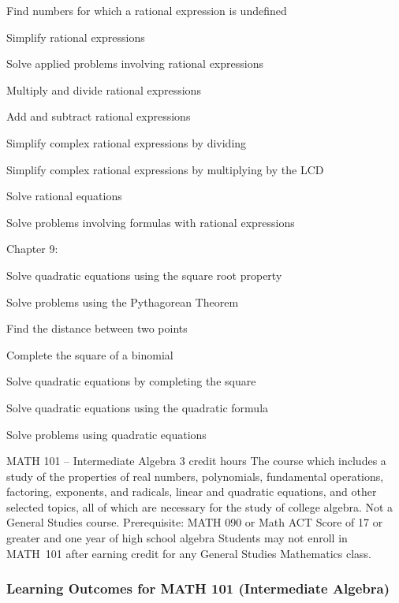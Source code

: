  \begin{alphalist}
    \item Find numbers for which a rational expression is undefined
    \item Simplify rational expressions
    \item Solve applied problems involving rational expressions
    \item Multiply and divide rational expressions
    \item Add and subtract rational expressions
    \item Simplify complex rational expressions by dividing
    \item Simplify complex rational expressions by multiplying by the LCD
    \item Solve rational equations
    \item Solve problems involving formulas with rational expressions
 \end{alphalist}
Chapter 9:
 \begin{alphalist}
    \item Solve quadratic equations using the square root property
    \item Solve problems using the Pythagorean Theorem
    \item Find the distance between two points
    \item Complete the square of a binomial
    \item Solve quadratic equations by completing the square
    \item Solve quadratic equations using the quadratic formula
    \item Solve problems using quadratic equations
 \end{alphalist}


MATH 101 – Intermediate Algebra 3 credit hours
The course which includes a study of the properties of real numbers, polynomials, fundamental operations, factoring, exponents, and radicals, linear and quadratic equations, and other selected topics, all of which are necessary for the study of college algebra. Not a General Studies course.
Prerequisite: MATH 090 or Math ACT Score of 17 or greater and one year of high school algebra Students may not enroll in MATH 101 after earning credit for any General Studies Mathematics class.

\subsubsection{Learning Outcomes for MATH 101 (Intermediate Algebra)}


